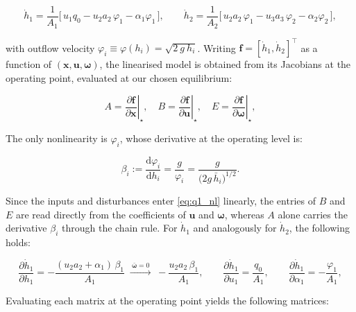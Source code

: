 \documentclass[10pt,a4paper]{scrartcl}
\begin{document}
\begin{equation}
    \dot h_1 = \frac{1}{A_1}\big[\,u_1 q_0 - u_2 a_2\,\varphi_1
                 - \alpha_1\varphi_1\,\big],
    \qquad
    \dot h_2 = \frac{1}{A_2}\big[\,u_2 a_2\,\varphi_1 - u_3 a_3\,\varphi_2
                 - \alpha_2\varphi_2\,\big],
    \label{eq:q1_nl}
\end{equation}

with outflow velocity $\varphi_i \equiv \varphi(h_i) = \sqrt{2 \ g \ h_i}$. Writing $\bm f = [\dot h_1, \dot h_2]^\top$ as a function of $(\bm x, \bm u, \bm \omega)$, the linearised model is obtained from its Jacobians at the operating point, evaluated at our chosen equilibrium:

\begin{equation}
    A=\left.\frac{\partial\bm{f}}{\partial\bm{x}}\right|_\star,\quad
    B=\left.\frac{\partial\bm{f}}{\partial\bm{u}}\right|_\star,\quad
    E=\left.\frac{\partial\bm{f}}{\partial\bm{\omega}}\right|_\star,
    \label{eq:q1_jac}
\end{equation}

The only nonlinearity is $\varphi_i$, whose derivative at the operating level is: 


\begin{equation}
    \beta_i:=\frac{\mathrm{d}\varphi_i}{\mathrm{d}h_i}
    =\frac{g}{\varphi_i}=\frac{g}{\Big({2g\,\bar h_i}\Big)^{1/2}} .
    \label{eq:q1_beta}
\end{equation}

Since the inputs and disturbances enter \eqref{eq:q1_nl} linearly, the entries of $B$ and $E$ are read directly from the coefficients of $\bm u$ and $\bm \omega$, whereas $A$ alone carries the derivative $\beta_i$ through the chain rule. For $\dot h_1$ and analogously for $\dot h_2$, the following holds: 

\begin{equation}
    \frac{\partial\dot h_1}{\partial h_1}
    =-\frac{(u_2a_2+\alpha_1)\,\beta_1}{A_1}
    \;\xrightarrow{\ \bar{\bm{\omega}}=0\ }\;
    -\frac{u_2a_2\,\beta_1}{A_1},\qquad
    \frac{\partial\dot h_1}{\partial u_1}=\frac{q_0}{A_1},\qquad
    \frac{\partial\dot h_1}{\partial\alpha_1}=-\frac{\varphi_1}{A_1},
    \label{eq:q1_entries}
\end{equation}

Evaluating each matrix at the operating point yields the following matrices: 
\end{document}
